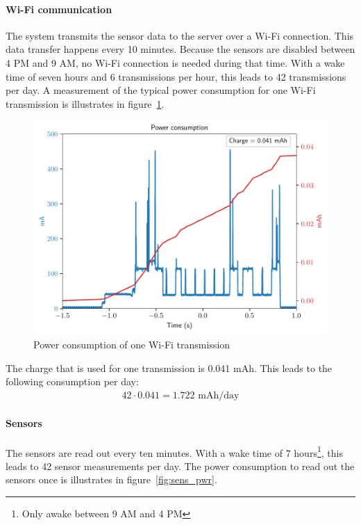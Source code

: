 \documentclass[11pt,a4paper]{article}
\begin{document}
\paragraph{Wi-Fi communication}
The system transmits the sensor data to the server over a Wi-Fi connection. This data transfer happens every 10 minutes. Because the sensors are disabled between 4 PM and 9 AM, no Wi-Fi connection is needed during that time. With a wake time of seven hours and 6 transmissions per hour, this leads to 42 transmissions per day. A measurement of the typical power consumption for one Wi-Fi transmission is illustrates in figure~\ref{fig:wifipwr}.
\begin{figure}[!ht]
	\centering
	\includegraphics[width=1.0\linewidth]{wifi_pwr.pdf}
	\caption{Power consumption of one Wi-Fi transmission}
	\label{fig:wifipwr}
\end{figure}
The charge that is used for one transmission is 0.041 mAh. This leads to the following consumption per day:
\begin{gather*}
42 \cdot 0.041 = 1.722 \text{ mAh/day}
\end{gather*}

\paragraph{Sensors}
The sensors are read out every ten minutes. With a wake time of 7 hours\footnote{Only awake between 9 AM and 4 PM}, this leads to 42 sensor measurements per day. The power consumption to read out the sensors once is illustrates in figure~\ref{fig:sens_pwr}.
\end{document}
